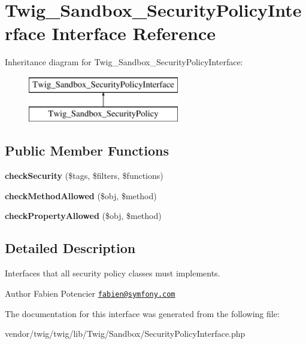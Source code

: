 \hypertarget{interfaceTwig__Sandbox__SecurityPolicyInterface}{}\section{Twig\+\_\+\+Sandbox\+\_\+\+Security\+Policy\+Interface Interface Reference}
\label{interfaceTwig__Sandbox__SecurityPolicyInterface}
Inheritance diagram for Twig\+\_\+\+Sandbox\+\_\+\+Security\+Policy\+Interface\+:\begin{figure}[H]
\begin{center}
\leavevmode
\includegraphics[height=2.000000cm]{interfaceTwig__Sandbox__SecurityPolicyInterface}
\end{center}
\end{figure}
\subsection*{Public Member Functions}
\begin{DoxyCompactItemize}
\item 
{\bfseries check\+Security} (\$tags, \$filters, \$functions)\hypertarget{interfaceTwig__Sandbox__SecurityPolicyInterface_a6b800eba27fa3ae03f04de7a5755c907}{}\label{interfaceTwig__Sandbox__SecurityPolicyInterface_a6b800eba27fa3ae03f04de7a5755c907}

\item 
{\bfseries check\+Method\+Allowed} (\$obj, \$method)\hypertarget{interfaceTwig__Sandbox__SecurityPolicyInterface_a49c0ae3eaf35f320986dc24fbaa0b79c}{}\label{interfaceTwig__Sandbox__SecurityPolicyInterface_a49c0ae3eaf35f320986dc24fbaa0b79c}

\item 
{\bfseries check\+Property\+Allowed} (\$obj, \$method)\hypertarget{interfaceTwig__Sandbox__SecurityPolicyInterface_aeb637ef3368d24d7ab0adbfb50940aec}{}\label{interfaceTwig__Sandbox__SecurityPolicyInterface_aeb637ef3368d24d7ab0adbfb50940aec}

\end{DoxyCompactItemize}


\subsection{Detailed Description}
Interfaces that all security policy classes must implements.

\begin{DoxyAuthor}{Author}
Fabien Potencier \href{mailto:fabien@symfony.com}{\tt fabien@symfony.\+com} 
\end{DoxyAuthor}


The documentation for this interface was generated from the following file\+:\begin{DoxyCompactItemize}
\item 
vendor/twig/twig/lib/\+Twig/\+Sandbox/Security\+Policy\+Interface.\+php\end{DoxyCompactItemize}
